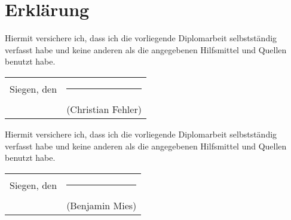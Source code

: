 

\chapter{Erklärung}

\thispagestyle{empty}

Hiermit versichere ich, dass ich die vorliegende Diplomarbeit selbstst\"andig
verfasst habe und keine anderen als die angegebenen Hilfsmittel und Quellen
benutzt habe.\vskip 1cm
\begin{tabular}{lc}
Siegen, den \date{\today} & \rule{7cm}{0.5pt} \\
                   & (Christian Fehler)
\end{tabular}\vskip 2cm

\noindent
Hiermit versichere ich, dass ich die vorliegende Diplomarbeit selbstst\"andig
verfasst habe und keine anderen als die angegebenen Hilfsmittel und Quellen
benutzt habe.\vskip 1cm
\begin{tabular}{lc}
Siegen, den \date{\today} & \rule{7cm}{0.5pt} \\
                   & (Benjamin Mies)
\end{tabular}
